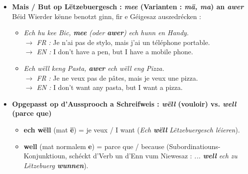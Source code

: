 \begin{itemize}
    \item \textbf{\flqq Mais / But\frqq{} op Lëtzebuergesch : \textit{mee} (Varianten : \textit{mä, ma}) an \textit{awer}} \\
    Béid Wierder kënne benotzt ginn, fir e Géigesaz auszedrécken :
    \begin{itemize}
        \item \textit{Ech hu kee Bic, \textbf{mee} (oder \textbf{awer}) ech hunn en Handy.} \\
        $\rightarrow$ \textit{FR :} Je n'ai pas de stylo, mais j'ai un téléphone portable. \\
        $\rightarrow$ \textit{EN :} I don't have a pen, but I have a mobile phone.
        \item \textit{Ech wëll keng Pasta, \textbf{awer} ech wëll eng Pizza.} \\
        $\rightarrow$ \textit{FR :} Je ne veux pas de pâtes, mais je veux une pizza. \\
        $\rightarrow$ \textit{EN :} I don't want any pasta, but I want a pizza.
    \end{itemize}

    \vspace{0.3em}

    \item \textbf{Opgepasst op d'Aussprooch a Schreifweis : \textit{wëll} (vouloir) vs. \textit{well} (parce que)}
    \begin{itemize}
        \item \textbf{ech wëll} (mat \textbf{ë}) = je veux / I want (\textit{Ech \textbf{wëll} Lëtzebuergesch léieren}).
        \item \textbf{well} (mat normalem \textbf{e}) = parce que / because (Subordinatiouns-Konjunktioun, schéckt d'Verb un d'Enn vum Niewesaz : \textit{... \textbf{well} ech zu Lëtzebuerg \textbf{wunnen}}).
    \end{itemize}

    \vspace{0.3em}


\end{itemize}
